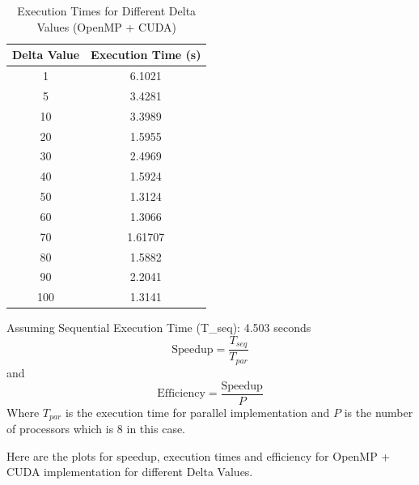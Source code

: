 \documentclass{article}
\begin{document}
\begin{table}[ht]
    \centering
    \caption{Execution Times for Different Delta Values (OpenMP + CUDA)}
    \begin{tabular}{|c|c|}
        \hline
        \textbf{Delta Value} & \textbf{Execution Time (s)} \\
        \hline
        1 & 6.1021 \\
        \hline
        5 & 3.4281 \\
        \hline
        10 & 3.3989 \\
        \hline
        20 & 1.5955 \\
        \hline
        30 & 2.4969 \\
        \hline
        40 & 1.5924 \\
        \hline
        50 & 1.3124 \\
        \hline
        60 & 1.3066 \\
        \hline
        70 & 1.61707 \\
        \hline
        80 & 1.5882 \\
        \hline
        90 & 2.2041 \\
        \hline
        100 & 1.3141 \\
        \hline
    \end{tabular}
    \label{tab:delta_timing}

    Assuming Sequential Execution Time (T\_seq): 4.503 seconds
    \begin{equation}
        \text{Speedup} = \frac{T_{seq}}{T_{par}}
    \end{equation}
    and 
    \begin{equation}
        \text{Efficiency} = \frac{\text{Speedup}}{P}
    \end{equation}
    Where $T_{par}$ is the execution time for parallel implementation and $P$ is the number of processors which is 8 in this case.

\end{table}
Here are the plots for speedup, execution times and efficiency for OpenMP + CUDA implementation for different Delta Values.
\end{document}
